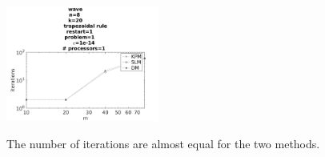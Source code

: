\begin{figure}[H]
        \centering

                \includegraphics[width=0.45\textwidth]{../MATLAB/fig/resultiter.jpg}
        \label{fig:resultiter}
        \caption{The number of iterations are almost equal for the two methods.}
\end{figure}

